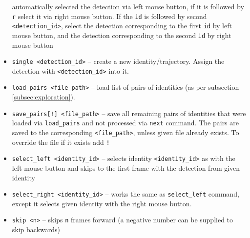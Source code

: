 \begin{itemize}
    automatically selected the detection via left mouse button, if it is followed by
    \verb+r+ select it via right mouse button. If the \verb+id+ is followed by second
    \verb+<detection_id>+, select the detection corresponding to the first \verb+id+ by left
    mouse button, and the detection corresponding to the second \verb+id+ by right mouse button
    \item \verb+single <detection_id>+ -- create a new identity/trajectory. Assign the
    detection with \verb+<detection_id>+ into it.
    \item \verb+load_pairs <file_path>+ -- load list of pairs of identities (as per subsection \ref{subsec:exploration}). 
    \item \verb+save_pairs[!] <file_path>+ -- save all remaining pairs of identities that were loaded via \verb+load_pairs+ and not processed via \verb+next+ command. The
    pairs are saved to the corresponding \verb+<file_path>+, unless given file already
    exists. To override the file if it exists add \verb+!+
    \item \verb+select_left <identity_id>+ -- selects identity \verb+<identity_id>+ 
    as with the left mouse button and
    skips to the first frame with the detection from given identity
    \item \verb+select_right <identity_id>+ -- works the same as \verb+select_left+
    command, except it selects given identity with the right mouse button.
    \item \verb+skip <n>+ -- skips \verb+n+ frames forward (a negative number can be supplied to skip backwards)
\end{itemize}

